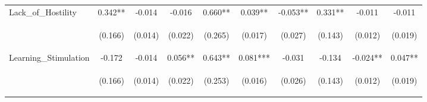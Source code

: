 \begin{tabular}{lccccccccc}
\noalign{\smallskip}Lack_of_Hostility & 0.342** & -0.014 & -0.016 & 0.660** & 0.039** & -0.053** & 0.331** & -0.011 & -0.011\\
 & \begin{footnotesize}(0.166)\end{footnotesize} & \begin{footnotesize}(0.014)\end{footnotesize} & \begin{footnotesize}(0.022)\end{footnotesize} & \begin{footnotesize}(0.265)\end{footnotesize} & \begin{footnotesize}(0.017)\end{footnotesize} & \begin{footnotesize}(0.027)\end{footnotesize} & \begin{footnotesize}(0.143)\end{footnotesize} & \begin{footnotesize}(0.012)\end{footnotesize} & \begin{footnotesize}(0.019)\end{footnotesize}\\
\noalign{\smallskip}Learning_Stimulation & -0.172 & -0.014 & 0.056** & 0.643** & 0.081*** & -0.031 & -0.134 & -0.024** & 0.047**\\
 & \begin{footnotesize}(0.166)\end{footnotesize} & \begin{footnotesize}(0.014)\end{footnotesize} & \begin{footnotesize}(0.022)\end{footnotesize} & \begin{footnotesize}(0.253)\end{footnotesize} & \begin{footnotesize}(0.016)\end{footnotesize} & \begin{footnotesize}(0.026)\end{footnotesize} & \begin{footnotesize}(0.143)\end{footnotesize} & \begin{footnotesize}(0.012)\end{footnotesize} & \begin{footnotesize}(0.019)\end{footnotesize}\\

\end{tabular}
